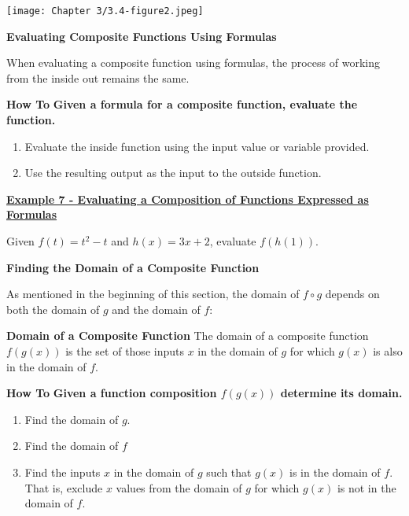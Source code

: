 \documentclass[12pt]{book}
\begin{document}
\texttt{[image: Chapter 3/3.4-figure2.jpeg]}

 \newpage



{\large \textbf{Evaluating Composite Functions Using Formulas}}


When evaluating a composite function using formulas, the process of working from the inside out remains the same. 

\vspace{3mm}

\begin{boxR}
    \textbf{How To}
    \vspace{1mm}
    \hline
    \vspace{2mm}
    \textbf{Given a formula for a composite function, evaluate the function.}
    \begin{enumerate}
        \item Evaluate the inside function using the input value or variable provided.
        \item Use the resulting output as the input to the outside function.
    \end{enumerate}
\end{boxR}
\vspace{3mm}



\underline{\textbf{Example 7 - Evaluating a Composition of Functions Expressed as Formulas}}

Given $f(t)=t^2-t$ and $h(x)= 3x+2$, evaluate $f(h(1))$.

\newpage

{\large \textbf{Finding the Domain of a Composite Function}}

As mentioned in the beginning of this section, the domain of $f \circ g$ depends on both the domain of $g$ and the domain of $f$:
\\

\begin{boxR}
    \textbf{Domain of a Composite Function}
    \vspace{1mm}
    \hline
    \vspace{2mm}
    The domain of a composite function $f(g(x))$ is the set of those inputs $x$ in the domain of $g$ for which $g(x)$ is also in the domain of $f$.
\end{boxR}

\begin{boxR}
    \textbf{How To}
    \vspace{1mm}
    \hline
    \vspace{2mm}
    \textbf{Given a function composition $f(g(x))$ determine its domain.}
    \begin{enumerate}
        \item Find the domain of $g$.
        \item Find the domain of $f$
        \item Find the inputs $x$ in the domain of $g$ such that $g(x)$ is in the domain of $f$. That is, exclude $x$ values from the domain of $g$ for which $g(x)$ is not in the domain of $f$.
    \end{enumerate}
\end{boxR}
\end{document}
